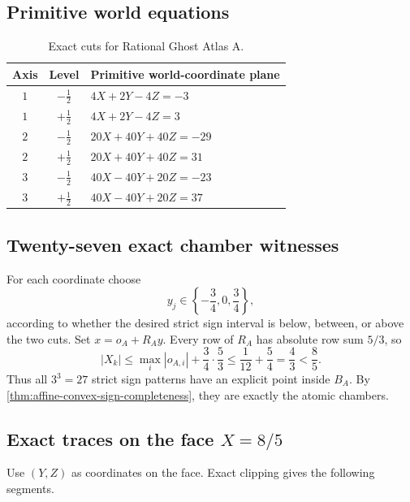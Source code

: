 \documentclass[11pt,openany]{book}
\theoremstyle{polyplain}
\theoremstyle{polydef}
\begin{document}
\subsection{Primitive world equations}

\begin{table}[htbp]
\centering
\begin{tabular}{ccl}
\toprule
Axis & Level & Primitive world-coordinate plane\\
\midrule
$1$ & $-\frac12$ & $4X+2Y-4Z=-3$\\
$1$ & $+\frac12$ & $4X+2Y-4Z=3$\\
$2$ & $-\frac12$ & $20X+40Y+40Z=-29$\\
$2$ & $+\frac12$ & $20X+40Y+40Z=31$\\
$3$ & $-\frac12$ & $40X-40Y+20Z=-23$\\
$3$ & $+\frac12$ & $40X-40Y+20Z=37$\\
\bottomrule
\end{tabular}
\caption{Exact cuts for Rational Ghost Atlas A.}
\label{tab:ghost-a-planes}
\end{table}

\subsection{Twenty-seven exact chamber witnesses}

For each coordinate choose
\[
y_j\in\left\{-\frac34,0,\frac34\right\},
\]
according to whether the desired strict sign interval is below, between, or above the two cuts. Set $x=o_A+R_Ay$. Every row of $R_A$ has absolute row sum $5/3$, so
\[
|X_k|\le \max_i|o_{A,i}|+\frac34\cdot\frac53
\le \frac1{12}+\frac54=\frac43<\frac85.
\]
Thus all $3^3=27$ strict sign patterns have an explicit point inside $B_A$. By \cref{thm:affine-convex-sign-completeness}, they are exactly the atomic chambers.

\subsection{Exact traces on the face \texorpdfstring{$X=8/5$}{X=8/5}}

Use $(Y,Z)$ as coordinates on the face. Exact clipping gives the following segments.
\end{document}
